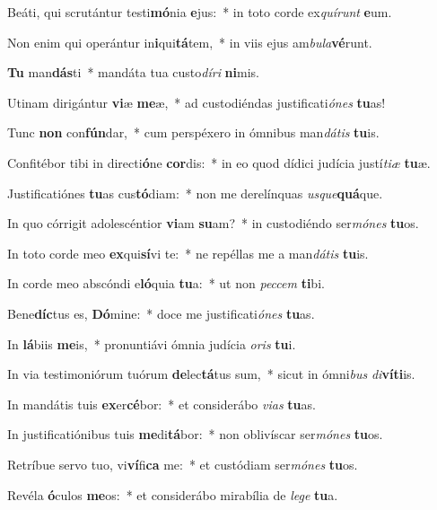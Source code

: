 \item Beáti, qui scrutántur testi\textbf{mó}nia \textbf{e}jus:~* in toto corde ex\textit{quí}\textit{runt} \textbf{e}um.
\item Non enim qui operántur in\textbf{i}qui\textbf{tá}tem,~* in viis ejus am\textit{bu}\textit{la}\textbf{vé}runt.
\item \textbf{Tu} man\textbf{dás}ti~* mandáta tua custo\textit{dí}\textit{ri} \textbf{ni}mis.
\item Utinam dirigántur \textbf{vi}æ \textbf{me}æ,~* ad custodiéndas justificati\textit{ó}\textit{nes} \textbf{tu}as!
\item Tunc \textbf{non} con\textbf{fún}dar,~* cum perspéxero in ómnibus man\textit{dá}\textit{tis} \textbf{tu}is.
\item Confitébor tibi in directi\textbf{ó}ne \textbf{cor}dis:~* in eo quod dídici judícia justí\textit{ti}\textit{æ} \textbf{tu}æ.
\item Justificatiónes \textbf{tu}as cus\textbf{tó}diam:~* non me derelínquas \textit{us}\textit{que}\textbf{quá}que.
\item In quo córrigit adolescéntior \textbf{vi}am \textbf{su}am?~* in custodiéndo ser\textit{mó}\textit{nes} \textbf{tu}os.
\item In toto corde meo \textbf{ex}qui\textbf{sí}vi te:~* ne repéllas me a man\textit{dá}\textit{tis} \textbf{tu}is.
\item In corde meo abscóndi e\textbf{ló}quia \textbf{tu}a:~* ut non \textit{pec}\textit{cem} \textbf{ti}bi.
\item Bene\textbf{díc}tus es, \textbf{Dó}mine:~* doce me justificati\textit{ó}\textit{nes} \textbf{tu}as.
\item In \textbf{lá}biis \textbf{me}is,~* pronuntiávi ómnia judícia \textit{o}\textit{ris} \textbf{tu}i.
\item In via testimoniórum tuórum \textbf{de}lec\textbf{tá}tus sum,~* sicut in ómni\textit{bus} \textit{di}\textbf{ví}\textbf{ti}is.
\item In mandátis tuis \textbf{ex}er\textbf{cé}bor:~* et considerábo \textit{vi}\textit{as} \textbf{tu}as.
\item In justificatiónibus tuis \textbf{me}di\textbf{tá}bor:~* non oblivíscar ser\textit{mó}\textit{nes} \textbf{tu}os.
\item Retríbue servo tuo, vi\textbf{ví}fi\textbf{ca} me:~* et custódiam ser\textit{mó}\textit{nes} \textbf{tu}os.
\item Revéla \textbf{ó}culos \textbf{me}os:~* et considerábo mirabília de \textit{le}\textit{ge} \textbf{tu}a.
